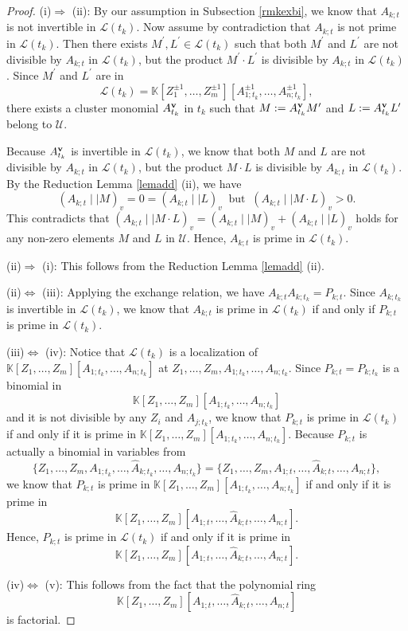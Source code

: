 \documentclass{amsart}
\theoremstyle{definition}
\theoremstyle{remark}
\numberwithin{equation}{section}
\begin{document}
\begin{proof}
(i)$\Longrightarrow$ (ii): By our assumption in Subsection \ref{rmkexbi}, we know that $A_{k;t}$ is not invertible in $\mathcal L(t_k)$. Now assume by contradiction that $A_{k;t}$ is not prime in $\mathcal L(t_k)$. Then there exists $M^\prime,L^\prime\in \mathcal L(t_k)$ such that both $M^\prime$ and $L^\prime$ are not divisible by $A_{k;t}$ in $\mathcal L(t_k)$, but the product $M^\prime\cdot L^\prime$ is divisible by  $A_{k;t}$ in $\mathcal L(t_k)$.  Since $M^\prime$ and $L^\prime$ are in $$\mathcal L(t_k)=\mathbb {K}[Z_1^{\pm1},\ldots,Z_m^{\pm1}][A_{1;t_k}^{\pm1},\ldots,A_{n;t_k}^{\pm1}],$$ there exists a cluster monomial
$A_{t_k}^{\bf v}$ in $t_k$ such that $M:=A_{t_k}^{\bf v}M^\prime$ and $L:=A_{t_k}^{\bf v} L^\prime$ belong to $\mathcal U$.

Because $A_{t_k}^{\bf v}$ is invertible in $\mathcal L(t_k)$, we know that both  $M$ and $L$ are not divisible by $A_{k;t}$ in $\mathcal L(t_k)$, but the product $M\cdot L$ is divisible by  $A_{k;t}$ in $\mathcal L(t_k)$. By the Reduction Lemma \ref{lemadd} (ii), we have $$(A_{k;t}\mid\mid  M)_v=0=(A_{k;t}\mid\mid L)_v\;\; \text{but}\;\;(A_{k;t}\mid\mid  M\cdot L)_v>0.$$ This contradicts that $(A_{k;t}\mid\mid M\cdot L)_v=(A_{k;t}\mid\mid M)_v+(A_{k;t}\mid\mid L)_v$ holds for any non-zero elements $M$ and $L$ in $\mathcal U$.
Hence,  $A_{k;t}$ is  prime in $\mathcal L(t_k)$.



(ii)$\Longrightarrow$ (i): This follows from the Reduction Lemma \ref{lemadd} (ii).



(ii)$\Longleftrightarrow$ (iii): Applying the exchange relation, we have $A_{k;t}A_{k;t_k}=P_{k;t}$. Since $A_{k;t_k}$ is invertible in $\mathcal L(t_k)$, we know that $A_{k;t}$ is prime in $\mathcal L(t_k)$ if and only if $P_{k;t}$ is prime in $\mathcal L(t_k)$.

(iii)$\Longleftrightarrow$ (iv): Notice that $\mathcal L(t_k)$ is a localization of $\mathbb K[Z_1,\ldots,Z_m][A_{1;t_k},\ldots,A_{n;t_k}]$ at $Z_1,\ldots,Z_m, A_{1;t_k},\ldots,A_{n;t_k}$. Since $P_{k;t}=P_{k;t_k}$ is a binomial in $$\mathbb K[Z_1,\ldots,Z_m][A_{1;t_k},\ldots,A_{n;t_k}]$$ and it is not divisible by any $Z_i$ and $A_{j;t_k}$, we know that $P_{k;t}$ is prime in  $\mathcal L(t_k)$ if and only if it is prime in $\mathbb K[Z_1,\ldots,Z_m][A_{1;t_k},\ldots,A_{n;t_k}]$. Because $P_{k;t}$ is actually a binomial in variables from
$$\{Z_1,\ldots,Z_m, A_{1;t_k},\ldots,\widehat A_{k;t_k},\ldots,A_{n;t_k}\}=\{Z_1,\ldots,Z_m, A_{1;t},\ldots,\widehat A_{k;t},\ldots,A_{n;t}\},$$
 we know that $P_{k;t}$ is prime in $\mathbb K[Z_1,\ldots,Z_m][A_{1;t_k},\ldots,A_{n;t_k}]$ if and only if it is prime in $$\mathbb K[Z_1,\ldots,Z_m][A_{1;t},\ldots,\widehat A_{k;t},\ldots,A_{n;t}].$$
Hence,  $P_{k;t}$ is prime in  $\mathcal L(t_k)$ if and only if it is prime in $$\mathbb K[Z_1,\ldots,Z_m][A_{1;t},\ldots,\widehat A_{k;t},\ldots,A_{n;t}].$$

(iv)$\Longleftrightarrow$ (v): This follows from the fact that the polynomial ring  $$\mathbb K[Z_1,\ldots,Z_m][A_{1;t},\ldots,\widehat A_{k;t},\ldots,A_{n;t}]$$ is factorial.
\end{proof}
\end{document}
